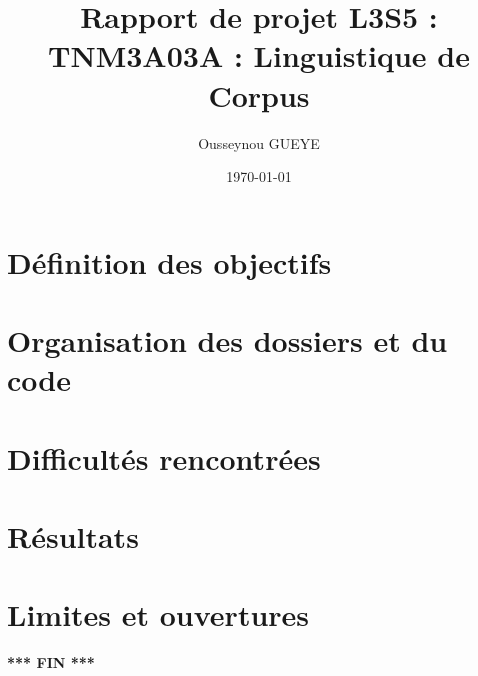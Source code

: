 \documentclass[12pt, a4paper]{report}%
\title{\textbf{Rapport de projet L3S5 : \\ TNM3A03A : Linguistique de Corpus} }
\author{Ousseynou GUEYE}
\date{\today}
\begin{document}
\maketitle
		\begin{onehalfspace}

\tableofcontents



	\chapter{Définition des objectifs}


	\chapter{Organisation des dossiers et du code}


	\chapter{Difficultés rencontrées}


	\chapter{Résultats}


	\chapter{Limites et ouvertures}


\begin{center}
\textbf{*** FIN ***}
\end{center}



		\end{onehalfspace}
\end{document}
